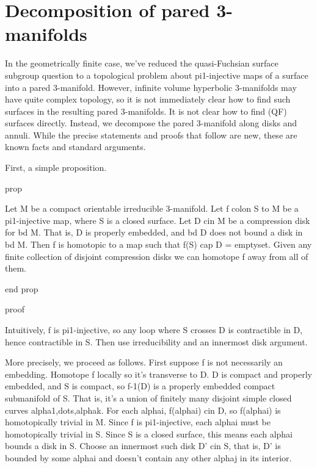 \section{Decomposition of pared 3-manifolds}

In the geometrically finite case, we've reduced the quasi-Fuchsian surface
subgroup question to a topological problem about pi1-injective maps of
a surface into a pared 3-manifold. However, infinite volume hyperbolic
3-manifolds may have quite complex topology, so it is not immediately clear how
to find such surfaces in the resulting pared 3-manifolds. It is not clear how
to find (QF) surfaces directly. Instead, we decompose the pared 3-manifold
along disks and annuli. While the precise statements and proofs that follow are
new, these are known facts and standard arguments.



%

First, a simple proposition.

prop

Let M be a compact orientable irreducible 3-manifold. Let f colon S to M be
a pi1-injective map, where S is a closed surface.  Let D cin M be a compression
disk for bd M.  That is, D is properly embedded, and bd D does not bound a disk
in bd M.  Then f is homotopic to a map such that f(S) cap D = emptyset. Given
any finite collection of disjoint compression disks we can homotope f away from
all of them.

end prop

proof

Intuitively, f is pi1-injective, so any loop where S crosses D is contractible
in D, hence contractible in S. Then use irreducibility and an innermost disk
argument.

More precisely, we proceed as follows. First suppose f is not necessarily an
embedding. Homotope f locally so it's transverse to D. D is compact and
properly embedded, and S is compact, so f-1(D) is a properly embedded compact
submanifold of S. That is, it's a union of finitely many disjoint simple closed
curves alpha1,dots,alphak. For each alphai, f(alphai) cin D, so f(alphai) is
homotopically trivial in M.  Since f is pi1-injective, each alphai must be
homotopically trivial in S. Since S is a closed surface, this means each alphai
bounds a disk in S. Choose an innermost such disk D' cin S, that is, D' is
bounded by some alphai and doesn't contain any other alphaj in its interior.

